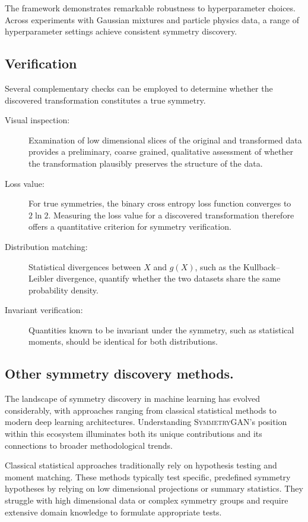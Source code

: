     The framework demonstrates remarkable robustness to hyperparameter choices.
    Across experiments with Gaussian mixtures and particle physics data, a range of hyperparameter settings achieve consistent symmetry discovery.

\subsection{Verification}
Several complementary checks can be employed to determine whether the discovered transformation constitutes a true symmetry.
\begin{description}
    \item[Visual inspection:] Examination of low dimensional slices of the original and transformed data provides a preliminary, coarse grained, qualitative assessment of whether the transformation plausibly preserves the structure of the data.
    \item[Loss value:] For true symmetries, the binary cross entropy loss function converges to \( 2 \ln 2 \). Measuring the loss value for a discovered transformation therefore offers a quantitative criterion for symmetry verification.
    \item[Distribution matching:] Statistical divergences between \( X \) and \( g(X) \), such as the Kullback--Leibler divergence, quantify whether the two datasets share the same probability density.
    \item[Invariant verification:] Quantities known to be invariant under the symmetry, such as statistical moments, should be identical for both distributions.
\end{description}
    
    \subsection{Other symmetry discovery methods.}
        The landscape of symmetry discovery in machine learning has evolved considerably, with approaches ranging from classical statistical methods to modern deep learning architectures.
        Understanding \textsc{SymmetryGAN}'s position within this ecosystem illuminates both its unique contributions and its connections to broader methodological trends.

        Classical statistical approaches traditionally rely on hypothesis testing and moment matching.
        These methods typically test specific, predefined symmetry hypotheses by relying on low dimensional projections or summary statistics.
        They struggle with high dimensional data or complex symmetry groups and require extensive domain knowledge to formulate appropriate tests.

